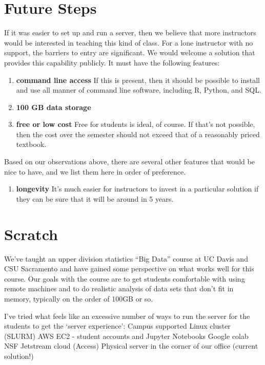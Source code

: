 \documentclass[12pt]{article}
\begin{document}
\section{Future Steps}

If it was easier to set up and run a server, then we believe that more instructors would be interested in teaching this kind of class.
For a lone instructor with no support, the barriers to entry are significant.
We would welcome a solution that provides this capability publicly.
It must have the following features:
\begin{enumerate}
\item \textbf{command line access} If this is present, then it should be possible to install and use all manner of command line software, including R, Python, and SQL.
\item \textbf{100 GB data storage} 
\item \textbf{free or low cost} Free for students is ideal, of course.
    If that's not possible, then the cost over the semester should not exceed that of a reasonably priced textbook.
\end{enumerate}
Based on our observations above, there are several other features that would be nice to have, and we list them here in order of preference.

\begin{enumerate}
\item \textbf{longevity} It's much easier for instructors to invest in a particular solution if they can be sure that it will be around in 5 years.
\end{enumerate}




\section{Scratch}

We've taught an upper division statistics ``Big Data'' course at UC Davis and CSU Sacramento and have gained some perspective on what works well for this course.
Our goals with the course are to get students comfortable with using remote machines and to do realistic analysis of data sets that don’t fit in memory, typically on the order of 100GB or so.
 
I’ve tried what feels like an excessive number of ways to run the server for the students to get the `server experience':
Campus supported Linux cluster (SLURM)
AWS EC2 - student accounts and Jupyter Notebooks
Google colab
NSF Jetstream cloud (Access)
Physical server in the corner of our office (current solution!)
\end{document}
